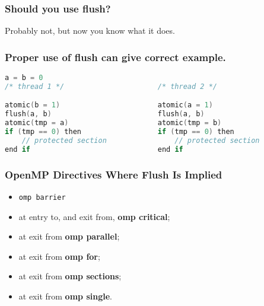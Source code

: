 \begin{frame}[fragile]
  \frametitle{Should you use flush?}

  
  \Large
  Probably not, but now you know what it does.
  

\end{frame}


\begin{frame}[fragile]
  \frametitle{Proper use of flush can give correct example.}

  \begin{lstlisting}[language=C,morekeywords={foreach,pragma,omp,parallel,single,nowait,task,untied,barrier,taskyield,mergeable,final,taskwait,critical}]
                    a = b = 0
/* thread 1 */                      /* thread 2 */

atomic(b = 1)                       atomic(a = 1)
flush(a, b)                         flush(a, b)
atomic(tmp = a)                     atomic(tmp = b)
if (tmp == 0) then                  if (tmp == 0) then
    // protected section                // protected section
end if                              end if
  \end{lstlisting}
\end{frame}

\begin{frame}
  \frametitle{OpenMP Directives Where Flush Is Implied}

\begin{changemargin}{2cm}
\large
  \begin{itemize}
    \item {\tt omp barrier}
    \item at entry to, and exit from, {\bf omp critical};
    \item at exit from {\bf omp parallel}; 
    \item at exit from {\bf omp for};
    \item at exit from {\bf omp sections};
    \item at exit from {\bf omp single}.
  \end{itemize}
\end{changemargin}

\end{frame}

